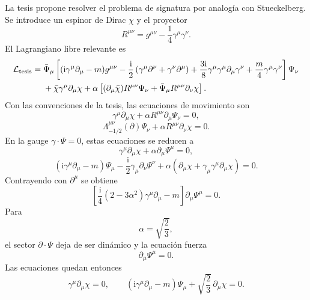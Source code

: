 \documentclass[11pt,a4paper]{article}
\numberwithin{equation}{section}
\newcommand{\Lcal}{\mathcal L}
\newcommand{\sdel}{\gamma^\mu\partial_\mu}
\newcommand{\ii}{\mathrm i}
\begin{document}
La tesis propone resolver el problema de signatura por analogía con Stueckelberg. Se introduce un espinor de Dirac $\chi$ y el proyector
\begin{equation}
R^{\mu\nu}=g^{\mu\nu}-\frac14\gamma^\mu\gamma^\nu.
\end{equation}
El Lagrangiano libre relevante es
\begin{align}
\label{eq:tesis-lagrangian}
\Lcal_{\rm tesis}
=&\;\bar\Psi_\mu
\left[
(\ii\sdel-m)g^{\mu\nu}
-\frac{\ii}{2}\left(\gamma^\mu\partial^\nu+\gamma^\nu\partial^\mu\right)
+\frac{3\ii}{8}\gamma^\mu\sdel\gamma^\nu
+\frac{m}{4}\gamma^\mu\gamma^\nu
\right]\Psi_\nu
\nonumber\\
&\;+\bar\chi\sdel\chi
+\alpha\left[(\partial_\mu\bar\chi)R^{\mu\nu}\Psi_\nu+\bar\Psi_\mu R^{\mu\nu}\partial_\nu\chi\right].
\end{align}
Con las convenciones de la tesis, las ecuaciones de movimiento son
\begin{equation}
\label{eq:eom-chi}
\sdel\chi+\alpha R^{\mu\nu}\partial_\mu\Psi_\nu=0,
\end{equation}
\begin{equation}
\label{eq:eom-psi}
\Lambda^{\mu\nu}_{-1/2}(\partial)\Psi_\nu+
\alpha R^{\mu\nu}\partial_\nu\chi=0.
\end{equation}
En la gauge $\gamma\cdot\Psi=0$, estas ecuaciones se reducen a
\begin{equation}
\sdel\chi+\alpha\partial_\mu\Psi^\mu=0,
\end{equation}
\begin{equation}
(\ii\sdel-m)\Psi_\mu
-\frac{\ii}{2}\gamma_\mu\partial_\nu\Psi^\nu
+\alpha(\partial_\mu\chi+\gamma_\mu\sdel\chi)=0.
\end{equation}
Contrayendo con $\partial^\mu$ se obtiene
\begin{equation}
\label{eq:divergence-sector}
\left[\frac{\ii}{4}(2-3\alpha^2)\sdel-m\right]\partial_\mu\Psi^\mu=0.
\end{equation}
Para
\begin{equation}
\label{eq:alpha-special}
\alpha=\sqrt{\frac23},
\end{equation}
el sector $\partial\cdot\Psi$ deja de ser dinámico y la ecuación fuerza
\begin{equation}
\partial_\mu\Psi^\mu=0.
\end{equation}
Las ecuaciones quedan entonces
\begin{equation}
\label{eq:reduced-free}
\sdel\chi=0,
\qquad
(\ii\sdel-m)\Psi_\mu+\sqrt{\frac23}\,\partial_\mu\chi=0.
\end{equation}
\end{document}
